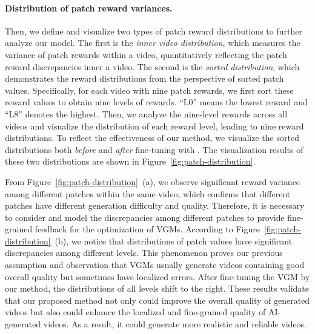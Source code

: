 \paragraph{Distribution of patch reward variances.}
Then, we define and visualize two types of patch reward distributions to further analyze our model. The first is the \textit{inner video distribution}, which measures the variance of patch rewards within a video, quantitatively reflecting the patch reward discrepancies inner a video. The second is the \textit{sorted distribution}, which demonstrates the reward distributions from the perspective of sorted patch values. Specifically, for each video with nine patch rewards, we first sort these reward values to obtain nine levels of rewards. ``L0'' means the lowest reward and ``L8'' denotes the highest. Then, we analyze the nine-level rewards across all videos and visualize the distribution of each reward level, leading to nine reward distributions. To reflect the effectiveness of our method, we visualize the sorted distributions both \textit{before} and \textit{after} fine-tuning with  \ours{}. The visualization results of these two distributions are shown in Figure~\ref{fig:patch-distribution}.

From Figure~\ref{fig:patch-distribution}~(a), we observe significant reward variance among different patches within the same video, which confirms that different patches have different generation difficulty and quality. Therefore, it is necessary to consider and model the discrepancies among different patches to provide fine-grained feedback for the optimization of VGMs. According to Figure~\ref{fig:patch-distribution}~(b), 
we notice that distributions of patch values have significant discrepancies among different levels. This phenomenon proves our previous assumption and observation that VGMs usually generate videos containing good overall quality but sometimes have localized errors. After fine-tuning the VGM by our method, the distributions of all levels shift to the right. These results validate that our proposed method not only could improve the overall quality of generated videos but also could enhance the localized and fine-grained quality of AI-generated videos. As a result, it could generate more realistic and reliable videos.

